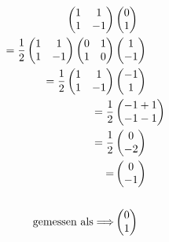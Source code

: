 \begin{align}
    \begin{pmatrix}
        1 & 1 \\
        1 & -1
    \end{pmatrix}
    &\begin{pmatrix}
        0 \\
        1
    \end{pmatrix} \\
    =
    \frac{1}{2}
    \begin{pmatrix}
        1 & 1 \\
        1 & -1
    \end{pmatrix}
    \begin{pmatrix}
        0 & 1 \\
        1 & 0
    \end{pmatrix} 
    &\begin{pmatrix}
        1 \\
        -1
    \end{pmatrix} \\
    =
    \frac{1}{2}
    \begin{pmatrix}
        1 & 1 \\
        1 & -1
    \end{pmatrix}
    &\begin{pmatrix}
        -1 \\
        1
    \end{pmatrix} \\
    =
    \frac{1}{2}
    &\begin{pmatrix}
        -1 +1 \\
        -1 -1
    \end{pmatrix} \\
    =
    \frac{1}{2}
    &\begin{pmatrix}
        0 \\
        -2
    \end{pmatrix} \\
    =
    &\begin{pmatrix}
        0 \\
        -1
    \end{pmatrix} \\
    \notag \\
    \text{gemessen als} \Longrightarrow 
    &\begin{pmatrix}
        0 \\
        1
    \end{pmatrix} 
\end{align}

